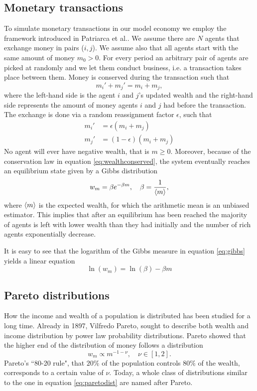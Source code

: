\documentclass[10pt, a4paper]{amsart}
\begin{document}
\subsection{Monetary transactions}
To simulate monetary transactions in our model economy we employ the framework introduced in Patriarca et al.\cite{Patriarca}. We assume there are $N$ agents that exchange money in pairs ($i,j$). We assume also that all agents start with the same amount of money $m_0>0$. For every period an arbitrary pair of agents are picked at randomly and we let them conduct business, i.e. a transaction takes place between them. Money is conserved during the transaction such that
\begin{equation}
\label{eq:wealthconserved}
m_i' + m_j'= m_i + m_j,
\end{equation}
where the left-hand side is the agent $i$ and $j$'s updated wealth and the right-hand side represents the amount of money agents $i$ and $j$ had before the transaction. The exchange is done via a random reassignment factor $\epsilon$, such that
\begin{align}
m_i' &= \epsilon (m_i + m_j) \\
m_j' &= (1 - \epsilon) (m_i + m_j)
\end{align}
No agent will ever have negative wealth, that is $m \geq 0$. Moreover, because of the conservation law in equation \ref{eq:wealthconserved}, the system eventually reaches an equilibrium state given by a Gibbs distribution
\begin{equation}
\label{eq:gibbs}
w_m = \beta e^{-\beta m}, \quad \beta = \frac{1}{\ev{m}},
\end{equation}
where $\ev{m}$ is the expected wealth, for which the arithmetic mean is an unbiased estimator. This implies that after an equilibrium has been reached the majority of agents is left with lower wealth than they had initially and
the number of rich agents exponentially decrease.

It is easy to see that the logarithm of the Gibbs measure in equation \ref{eq:gibbs} yields a linear equation
\begin{equation}
\label{eq:lingibbs}
\ln(w_m)=\ln(\beta) - \beta m
\end{equation}

\subsection{Pareto distributions}
How the income and wealth of a population is distributed has been studied for a long time. Already in 1897, Vilfredo Pareto, sought to describe both wealth and income distribution by power law probability distributions\cite{Pareto}. Pareto showed that the higher end of the distribution of money follows a distribution
\begin{equation}
\label{eq:paretodist}
w_m \propto m^{-1-\nu}, \quad \nu \in [1,2].
\end{equation}
Pareto's ``80-20 rule", that $20\%$ of the population controls $80\%$ of the wealth, corresponds to a certain value of $\nu$. Today, a whole class of distributions similar to the one in equation \ref{eq:paretodist} are named after Pareto\cite{Arnold}.
\end{document}
